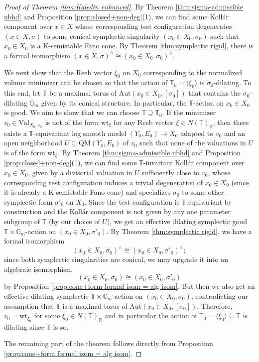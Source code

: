 \documentclass[12pt]{amsart}
\theoremstyle{definition}
\newcommand{\bR}{\mathbb{R}}
\newcommand{\bT}{\mathbb{T}}
\newcommand{\bG}{\mathbb{G}}
\newcommand{\Aut}{\mathrm{Aut}}
\newcommand{\Val}{\mathrm{Val}}
\newcommand{\QM}{\mathrm{QM}}
\newcommand{\wt}{\mathrm{wt}}
\numberwithin{equation}{section}
\begin{document}
\begin{proof}[Proof of Theorem \ref{thm:Kaledin enhanced}]
By Theorem \ref{thm:sigma-admissible nbhd} and Proposition \ref{prop:closed+non-deg}(1), we can find some Koll\'ar component over $x\in X$ whose corresponding test configuration degenerates $(x\in X,\sigma)$ to some conical symplectic singularity $(x_0\in X_0,\sigma_0)$ such that $x_0\in X_0$ is a K-semistable Fano cone. By Theorem \ref{thm:symplectic rigid}, there is a formal isomorphism $(x\in X,\sigma)^{\wedge}\cong (x_0\in X_0,\sigma_0)^{\wedge}$.

We next show that the Reeb vector $\xi_0$ on $X_0$ corresponding to the normalized volume minimizer can be chosen so that the action of $\bT_0=\langle\xi_0\rangle$ is $\sigma_0$-dilating. To this end, let $\bT$ be a maximal torus of $\Aut(x_0\in X_0,[\sigma_0])$ that contains the $\sigma_0$-dilating $\bG_m$ given by its conical structure. In particular, the $\bT$-action on $x_0\in X_0$ is good. We aim to show that we can choose $\mathbb T\supseteq \mathbb T_0$. 
If the minimizer $v_0\in \Val_{X_0,x_0}$ is not of the form $\wt_\xi$ for any Reeb vector $\xi\in N(\bT)_\bR$, then there exists a $\bT$-equivariant log smooth model $(Y_0,E_0)\to X_0$ adapted to $v_0$ and an open neighborhood $U\subseteq \QM(Y_0,E_0)$ of $v_0$ such that none of the valuations in $U$ is of the form $\wt_\xi$. By Theorem \ref{thm:sigma-admissible nbhd} and Proposition \ref{prop:closed+non-deg}(1), we can find some $\bT$-invariant Koll\'ar component over $x_0\in X_0$, given by a divisorial valuation in $U$ sufficiently close to $v_0$, whose corresponding test configuration induces a trivial degeneration of $x_0\in X_0$ (since it is already a K-semistable Fano cone) and specializes $\sigma_0$ to some other symplectic form $\sigma'_0$ on $X_0$. Since the test configuration is $\bT$-equivariant by construction and the Koll\'ar component is not given by any one parameter subgroup of $\bT$ (by our choice of $U$), we get an effective dilating symplectic good $\bT\times \bG_m$-action on $(x_0\in X_0,\sigma'_0)$. By Theorem \ref{thm:symplectic rigid}, we have a formal isomorphism 
\[
(x_0\in X_0,\sigma_0)^\wedge \cong (x_0\in X_0,\sigma'_0)^\wedge;
\]
since both symplectic singularities are conical, we may upgrade it into an algebraic isomorphism 
\[
(x_0\in X_0,\sigma_0) \cong (x_0\in X_0,\sigma'_0)
\]
by Proposition \ref{prop:cone+form formal isom = alg isom}. But then we also get an effective dilating symplectic $\bT\times \bG_m$-action on $(x_0\in X_0,\sigma_0)$, contradicting our assumption that $\bT$ is a maximal torus of $\Aut(x_0\in X_0,[\sigma_0])$. Therefore, $v_0=\wt_{\xi_0}$ for some $\xi_0\in N(\bT)_\bR$ and in particular the action of $\bT_0=\langle\xi_0\rangle\subseteq \bT$ is dilating since $\bT$ is so. 

The remaining part of the theorem follows directly from Proposition \ref{prop:cone+form formal isom = alg isom}.
\end{proof}
\end{document}
